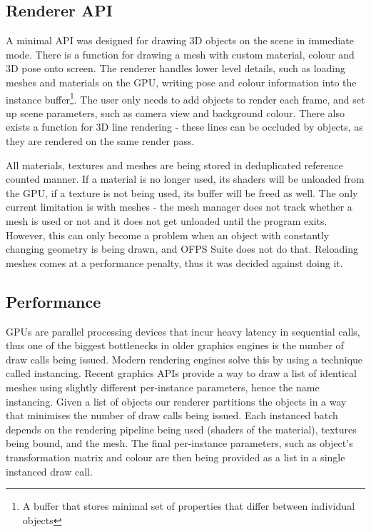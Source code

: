 \documentclass[11pt,english]{report}
\begin{document}
\subsection{Renderer API}

A minimal API was designed for drawing 3D objects on the scene in immediate mode. There is a function for drawing a mesh with custom material, colour and 3D pose onto screen. The renderer handles lower level details, such as loading meshes and materials on the GPU, writing pose and colour information into the instance buffer\footnote{A buffer that stores minimal set of properties that differ between individual objects}. The user only needs to add objects to render each frame, and set up scene parameters, such as camera view and background colour. There also exists a function for 3D line rendering - these lines can be occluded by objects, as they are rendered on the same render pass.

All materials, textures and meshes are being stored in deduplicated reference counted manner. If a material is no longer used, its shaders will be unloaded from the GPU, if a texture is not being used, its buffer will be freed as well. The only current limitation is with meshes - the mesh manager does not track whether a mesh is used or not and it does not get unloaded until the program exits. However, this can only become a problem when an object with constantly changing geometry is being drawn, and OFPS Suite does not do that. Reloading meshes comes at a performance penalty, thus it was decided against doing it.

\subsection{Performance}

GPUs are parallel processing devices that incur heavy latency in sequential calls, thus one of the biggest bottlenecks in older graphics engines is the number of draw calls being issued. Modern rendering engines solve this by using a technique called instancing. Recent graphics APIs provide a way to draw a list of identical meshes using slightly different per-instance parameters, hence the name instancing. Given a list of objects our renderer partitions the objects in a way that minimises the number of draw calls being issued. Each instanced batch depends on the rendering pipeline being used (shaders of the material), textures being bound, and the mesh. The final per-instance parameters, such as object's transformation matrix and colour are then being provided as a list in a single instanced draw call.
\end{document}
